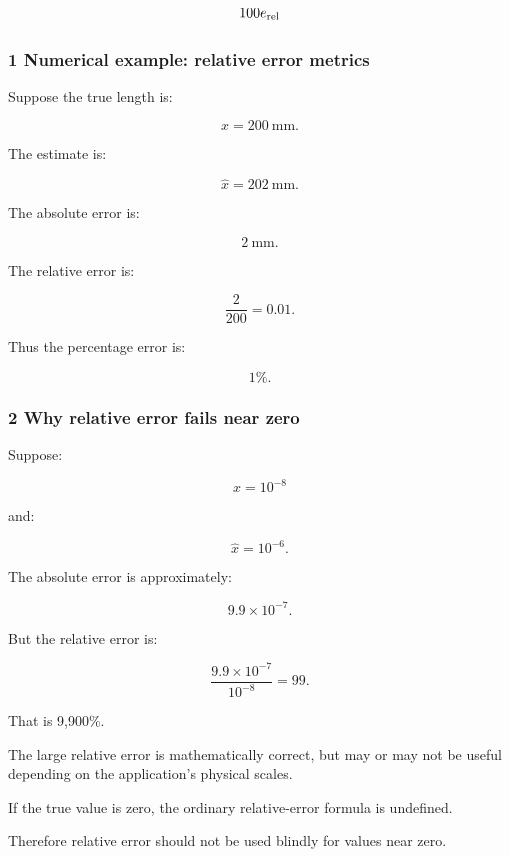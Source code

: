 \[
 100e_{\mathrm{rel}}\\%
\]

\subsubsection{1 Numerical example: relative error metrics}\label{02-foundations-ii-ch030-numerical-example-relative-error-metrics}

\hypertarget{02-foundations-ii-ch030-numerical-example-relative-error-metrics}{}

Suppose the true length is:

\[
 x=200\ \mathrm{mm}.
\]

The estimate is:

\[
 \hat x=202\ \mathrm{mm}.
\]

The absolute error is:

\[
 2\ \mathrm{mm}.
\]

The relative error is:

\[
 \frac2{200}=0.01.
\]

Thus the percentage error is:

\[
 \boxed{1\%}.
\]

\subsubsection{2 Why relative error fails near zero}\label{02-foundations-ii-ch030-why-relative-error-fails-near-zero}

\hypertarget{02-foundations-ii-ch030-why-relative-error-fails-near-zero}{}

Suppose:

\[
 x=10^{-8}
\]

and:

\[
 \hat x=10^{-6}.
\]

The absolute error is approximately:

\[
 9.9\times10^{-7}.
\]

But the relative error is:

\[
 \frac{9.9\times10^{-7}}{10^{-8}} =99.
\]

That is 9,900\%.

The large relative error is mathematically correct, but may or may not be useful depending on the application's physical scales.

If the true value is zero, the ordinary relative-error formula is undefined.

Therefore relative error should not be used blindly for values near zero.

